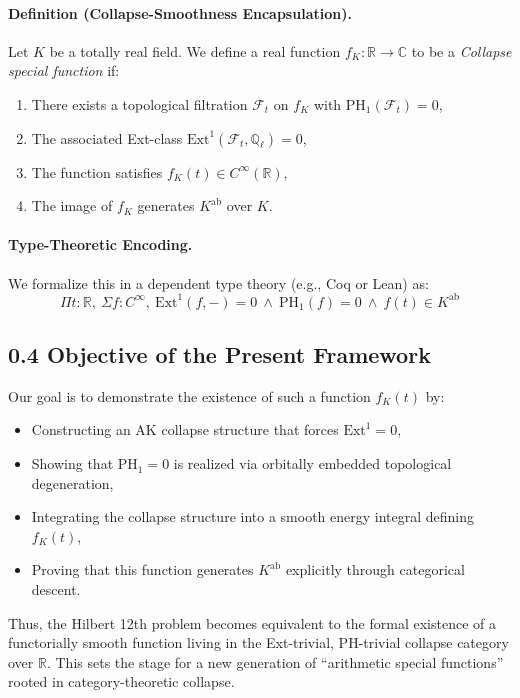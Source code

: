 \documentclass[11pt]{article}
\begin{document}
\paragraph{Definition (Collapse-Smoothness Encapsulation).}  
Let \( K \) be a totally real field. We define a real function \( f_K: \mathbb{R} \to \mathbb{C} \) to be a \emph{Collapse special function} if:
\begin{enumerate}[label=(C\arabic*)]
    \item There exists a topological filtration \( \mathcal{F}_t \) on \( f_K \) with \( \mathrm{PH}_1(\mathcal{F}_t) = 0 \),
    \item The associated Ext-class \( \mathrm{Ext}^1(\mathcal{F}_t, \mathbb{Q}_\ell) = 0 \),
    \item The function satisfies \( f_K(t) \in C^\infty(\mathbb{R}) \),
    \item The image of \( f_K \) generates \( K^{\mathrm{ab}} \) over \( K \).
\end{enumerate}

\paragraph{Type-Theoretic Encoding.}
We formalize this in a dependent type theory (e.g., Coq or Lean) as:
\[
\boxed{
\Pi t : \mathbb{R},\ \Sigma f : C^\infty,\ \mathrm{Ext}^1(f, -) = 0\ \wedge\ \mathrm{PH}_1(f) = 0\ \wedge\ f(t) \in K^{\mathrm{ab}}
}
\]

\subsection*{0.4 Objective of the Present Framework}

Our goal is to demonstrate the existence of such a function \( f_K(t) \) by:
\begin{itemize}
    \item Constructing an AK collapse structure that forces \( \mathrm{Ext}^1 = 0 \),
    \item Showing that PH\(_1 = 0 \) is realized via orbitally embedded topological degeneration,
    \item Integrating the collapse structure into a smooth energy integral defining \( f_K(t) \),
    \item Proving that this function generates \( K^{\mathrm{ab}} \) explicitly through categorical descent.
\end{itemize}

Thus, the Hilbert 12th problem becomes equivalent to the formal existence of a functorially smooth function living in the Ext-trivial, PH-trivial collapse category over \( \mathbb{R} \). This sets the stage for a new generation of “arithmetic special functions” rooted in category-theoretic collapse.
\end{document}
